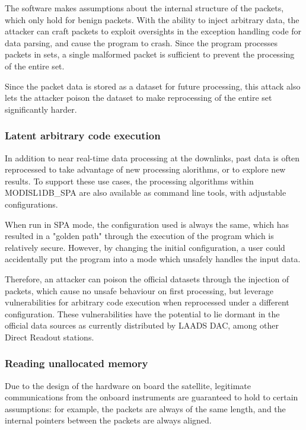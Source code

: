 The software makes assumptions about the internal structure of the packets, which only hold for benign packets.
With the ability to inject arbitrary data, the attacker can craft packets to exploit oversights in the exception handling code for data parsing, and cause the program to crash.
Since the program processes packets in sets, a single malformed packet is sufficient to prevent the processing of the entire set.

Since the packet data is stored as a dataset for future processing, this attack also lets the attacker poison the dataset to make reprocessing of the entire set significantly harder.


\subsubsection{Latent arbitrary code execution}

In addition to near real-time data processing at the downlinks, past data is often reprocessed to take advantage of new processing alorithms, or to explore new results.
To support these use cases, the processing algorithms within MODISL1DB\_SPA are also available as command line tools, with adjustable configurations.

When run in SPA mode, the configuration used is always the same, which has resulted in a "golden path" through the execution of the program which is relatively secure.
However, by changing the initial configuration, a user could accidentally put the program into a mode which unsafely handles the input data.

Therefore, an attacker can poison the official datasets through the injection of packets, which cause no unsafe behaviour on first processing, but leverage vulnerabilities for arbitrary code execution when reprocessed under a different configuration.
These vulnerabilities have the potential to lie dormant in the official data sources as currently distributed by LAADS DAC, among other Direct Readout stations.


\subsubsection{Reading unallocated memory}

Due to the design of the hardware on board the satellite, legitimate communications from the onboard instruments are guaranteed to hold to certain assumptions: for example, the packets are always of the same length, and the internal pointers between the packets are always aligned.

